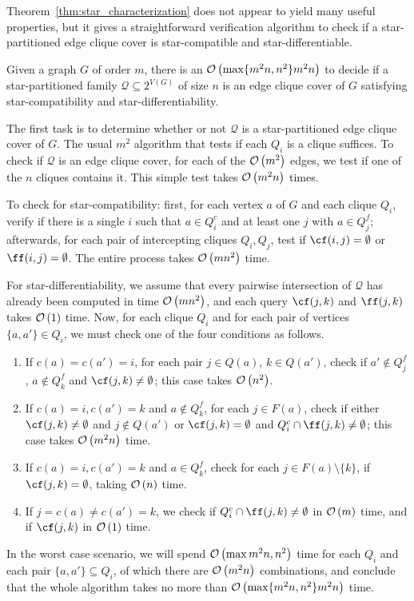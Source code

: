 Theorem~\ref{thm:star_characterization} does not appear to yield many useful properties, but it gives a straightforward verification algorithm to check if a star-partitioned edge clique cover is star-compatible and star-differentiable.

\begin{theorem}
    Given a graph $G$ of order $m$, there is an $\mathcal{O}\left(\max\{m^2n, n^2\}m^2n\right)$ to decide if a star-partitioned family $\mathcal{Q} \subseteq 2^{V(G)}$ of size $n$ is an edge clique cover of $G$ satisfying star-compatibility and star-differentiability. 
\end{theorem}

\begin{tproof}
    The first task is to determine whether or not $\mathcal{Q}$ is a star-partitioned edge clique cover of $G$.
    The usual $m^2$ algorithm that tests if each $Q_i$ is a clique suffices.
    To check if $\mathcal{Q}$ is an edge clique cover, for each of the $\mathcal{O}\left(m^2\right)$ edges, we test if one of the $n$ cliques contains it. 
    This simple test takes $\mathcal{O}\left(m^2n\right)$ times.
    
    To check for star-compatibility: first, for each vertex $a$ of $G$ and each clique $Q_i$, verify if there is a single $i$ such that $a \in Q_i^c$ and at least one $j$ with $a \in Q_j^f$;
    afterwards, for each pair of intercepting cliques $Q_i, Q_j$, test if $\cf(i,j) = \emptyset$ or $\ff(i,j) = \emptyset$.
    The entire process takes $\mathcal{O}\left(mn^2\right)$ time.
    
    For star-differentiability, we assume that every pairwise intersection of $\mathcal{Q}$ has already been computed in time $\mathcal{O}\left(mn^2\right)$, and each query $\cf(j,k)$ and $\ff(j,k)$ takes $\mathcal{O}\left(1\right)$ time.
    Now, for each clique $Q_i$ and for each pair of vertices $\{a, a'\} \in Q_i$, we must check one of the four conditions as follows.
    \begin{enumerate}
        \item If $c(a) = c(a') = i$, for each pair $j \in Q(a)$, $k \in Q(a')$, check if $a' \notin Q_j^f$, $a \notin Q_k^f$ and $\cf(j,k) \neq \emptyset$; this case takes $\mathcal{O}\left(n^2\right)$.
        \item If $c(a) = i, c(a') = k$ and $a \notin Q_k^f$, for each $j \in F(a)$, check if either $\cf(j,k) \neq \emptyset$ and $j \notin Q(a')$ or $\cf(j,k) = \emptyset$ and $Q_i^c \cap \ff(j,k) \neq \emptyset$; this case takes $\mathcal{O}\left(m^2n\right)$ time.
        \item If $c(a) = i, c(a') = k$ and $a \in Q_k^f$, check for each $j \in F(a) \setminus \{k\}$, if $\cf(j,k) = \emptyset$, taking $\mathcal{O}\left(n\right)$ time.
        \item If $j = c(a) \neq c(a') = k$, we check if $Q_i^c \cap \ff(j,k) \neq \emptyset$ in $\mathcal{O}\left(m\right)$ time, and if $\cf(j,k)$ in $\mathcal{O}\left(1\right)$ time.
    \end{enumerate}
    In the worst case scenario, we will spend $\mathcal{O}\left(\max{m^2n, n^2}\right)$ time for each $Q_i$ and each pair $\{a, a'\} \subseteq Q_i$, of which there are $\mathcal{O}\left(m^2n\right)$ combinations, and conclude that the whole algorithm takes no more than $\mathcal{O}\left(\max\{m^2n, n^2\}m^2n\right)$ time.
\end{tproof}


